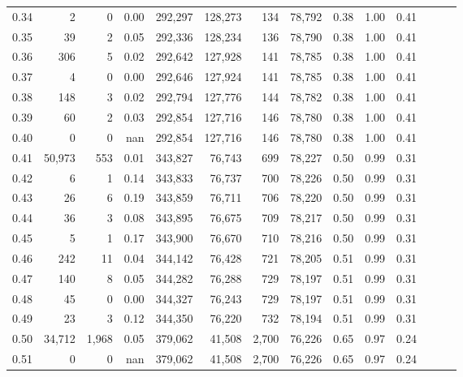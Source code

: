 \begin{tabular}{rrrrrrrrrrrrrr}
0.34 &       2 &       0 &  0.00 &  292,297 &  128,273 &     134 &  78,792 &  0.38 &  1.00 &      0.41 \\
0.35 &      39 &       2 &  0.05 &  292,336 &  128,234 &     136 &  78,790 &  0.38 &  1.00 &      0.41 \\
0.36 &     306 &       5 &  0.02 &  292,642 &  127,928 &     141 &  78,785 &  0.38 &  1.00 &      0.41 \\
0.37 &       4 &       0 &  0.00 &  292,646 &  127,924 &     141 &  78,785 &  0.38 &  1.00 &      0.41 \\
0.38 &     148 &       3 &  0.02 &  292,794 &  127,776 &     144 &  78,782 &  0.38 &  1.00 &      0.41 \\
0.39 &      60 &       2 &  0.03 &  292,854 &  127,716 &     146 &  78,780 &  0.38 &  1.00 &      0.41 \\
0.40 &       0 &       0 &   nan &  292,854 &  127,716 &     146 &  78,780 &  0.38 &  1.00 &      0.41 \\
0.41 &  50,973 &     553 &  0.01 &  343,827 &   76,743 &     699 &  78,227 &  0.50 &  0.99 &      0.31 \\
0.42 &       6 &       1 &  0.14 &  343,833 &   76,737 &     700 &  78,226 &  0.50 &  0.99 &      0.31 \\
0.43 &      26 &       6 &  0.19 &  343,859 &   76,711 &     706 &  78,220 &  0.50 &  0.99 &      0.31 \\
0.44 &      36 &       3 &  0.08 &  343,895 &   76,675 &     709 &  78,217 &  0.50 &  0.99 &      0.31 \\
0.45 &       5 &       1 &  0.17 &  343,900 &   76,670 &     710 &  78,216 &  0.50 &  0.99 &      0.31 \\
0.46 &     242 &      11 &  0.04 &  344,142 &   76,428 &     721 &  78,205 &  0.51 &  0.99 &      0.31 \\
0.47 &     140 &       8 &  0.05 &  344,282 &   76,288 &     729 &  78,197 &  0.51 &  0.99 &      0.31 \\
0.48 &      45 &       0 &  0.00 &  344,327 &   76,243 &     729 &  78,197 &  0.51 &  0.99 &      0.31 \\
0.49 &      23 &       3 &  0.12 &  344,350 &   76,220 &     732 &  78,194 &  0.51 &  0.99 &      0.31 \\
0.50 &  34,712 &   1,968 &  0.05 &  379,062 &   41,508 &   2,700 &  76,226 &  0.65 &  0.97 &      0.24 \\
0.51 &       0 &       0 &   nan &  379,062 &   41,508 &   2,700 &  76,226 &  0.65 &  0.97 &      0.24 \\

\end{tabular}
